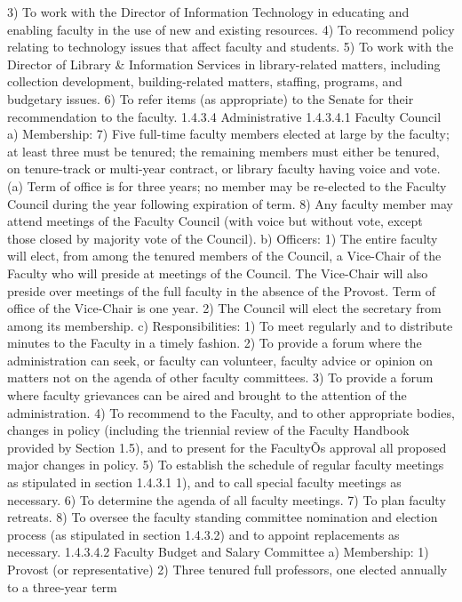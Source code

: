 \documentclass[letterpaper, 11pt]{article}
\begin{document}
3) To work with the Director of Information Technology in educating and enabling faculty in the use of new and existing resources. 
4) To recommend policy relating to technology issues that affect faculty and students.
5) To work with the Director of Library \& Information Services in library-related matters, including collection development, building-related matters, staffing, programs, and budgetary issues.
6) To refer items (as appropriate) to the Senate for their recommendation to the faculty.
1.4.3.4 Administrative
1.4.3.4.1 Faculty Council
a) Membership:
7) Five full-time faculty members elected at large by the faculty; at least three must be tenured; the remaining members must either be tenured, on tenure-track or multi-year contract, or library faculty having voice and vote.
(a) Term of office is for three years; no member may be re-elected to the Faculty Council during the year following expiration of term.
8) Any faculty member may attend meetings of the Faculty Council (with voice but without vote, except those closed by majority vote of the Council).
b) Officers:
1) The entire faculty will elect, from among the tenured members of the Council, a Vice-Chair of the Faculty who will preside at meetings of the Council.  The Vice-Chair will also preside over meetings of the full faculty in the absence of the Provost.  Term of office of the Vice-Chair is one year.
2) The Council will elect the secretary from among its membership.
c) Responsibilities:
1) To meet regularly and to distribute minutes to the Faculty in a timely fashion.
2) To provide a forum where the administration can seek, or faculty can volunteer, faculty advice or opinion on matters not on the agenda of other faculty committees.
3) To provide a forum where faculty grievances can be aired and brought to the attention of the administration.
4) To recommend to the Faculty, and to other appropriate bodies, changes in policy (including the triennial review of the Faculty Handbook provided by Section 1.5), and to present for the FacultyÕs approval all proposed major changes in policy.
5) To establish the schedule of regular faculty meetings as stipulated in section 1.4.3.1 1), and to call special faculty meetings as necessary.
6) To determine the agenda of all faculty meetings.
7) To plan faculty retreats.
8) To oversee the faculty standing committee nomination and election process (as stipulated in section 1.4.3.2)  and to appoint replacements as necessary.
1.4.3.4.2   Faculty Budget and Salary Committee
a) Membership:
1) Provost (or representative)
2) Three tenured full professors, one elected annually to a three-year term
\end{document}

